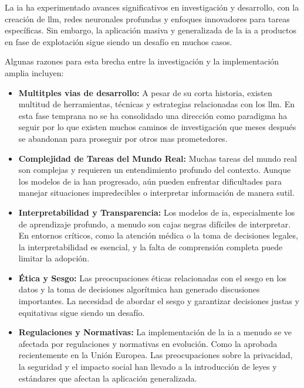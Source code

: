 La \acrshort{ia} ha experimentado avances significativos en investigación y desarrollo, con la creación de \acrshort{llm}, redes neuronales profundas y enfoques innovadores para tareas específicas. Sin embargo, la aplicación masiva y generalizada de la \acrshort{ia} a productos en fase de explotación sigue siendo un desafío en muchos casos.

Algunas razones para esta brecha entre la investigación y la implementación amplia incluyen:

\begin{itemize}

\item \textbf{Multitples vias de desarrollo:} A pesar de su corta historia, existen multitud de herramientas, técnicas y estrategias relacionadas con los \acrshort{llm}. En esta fase temprana no se ha consolidado una dirección como paradigma ha seguir por lo que existen muchos caminos de investigación que meses después se abandonan para proseguir por otros mas prometedores.

\item \textbf{Complejidad de Tareas del Mundo Real:} Muchas tareas del mundo real son complejas y requieren un entendimiento profundo del contexto. Aunque los modelos de \acrshort{ia} han progresado, aún pueden enfrentar dificultades para manejar situaciones impredecibles o interpretar información de manera sutil.

\item \textbf{Interpretabilidad y Transparencia:} Los modelos de \acrshort{ia}, especialmente los de aprendizaje profundo, a menudo son cajas negras difíciles de interpretar. En entornos críticos, como la atención médica o la toma de decisiones legales, la interpretabilidad es esencial, y la falta de comprensión completa puede limitar la adopción.

\item \textbf{Ética y Sesgo:} Las preocupaciones éticas relacionadas con el sesgo en los datos y la toma de decisiones algorítmica han generado discusiones importantes. La necesidad de abordar el sesgo y garantizar decisiones justas y equitativas sigue siendo un desafío.

\item \textbf{Regulaciones y Normativas:} La implementación de la \acrshort{ia} a menudo se ve afectada por regulaciones y normativas en evolución. Como la aprobada recientemente en la Unión Europea. Las preocupaciones sobre la privacidad, la seguridad y el impacto social han llevado a la introducción de leyes y estándares que afectan la aplicación generalizada.

\end{itemize}

